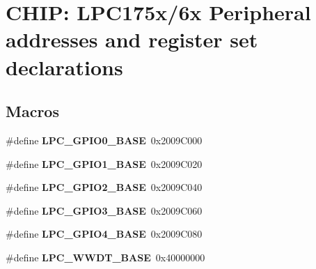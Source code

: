 \hypertarget{group___p_e_r_i_p_h__175_x__6_x___b_a_s_e}{\section{C\+H\+I\+P\+: L\+P\+C175x/6x Peripheral addresses and register set declarations}
\label{group___p_e_r_i_p_h__175_x__6_x___b_a_s_e}
}
\subsection*{Macros}
\begin{DoxyCompactItemize}
\item 
\hypertarget{group___p_e_r_i_p_h__175_x__6_x___b_a_s_e_ga09e0e964ea1abf3b991772df2aa52405}{\#define {\bfseries L\+P\+C\+\_\+\+G\+P\+I\+O0\+\_\+\+B\+A\+S\+E}~0x2009\+C000}\label{group___p_e_r_i_p_h__175_x__6_x___b_a_s_e_ga09e0e964ea1abf3b991772df2aa52405}

\item 
\hypertarget{group___p_e_r_i_p_h__175_x__6_x___b_a_s_e_ga9fb0536853721a3073bd69d94d0b7ec2}{\#define {\bfseries L\+P\+C\+\_\+\+G\+P\+I\+O1\+\_\+\+B\+A\+S\+E}~0x2009\+C020}\label{group___p_e_r_i_p_h__175_x__6_x___b_a_s_e_ga9fb0536853721a3073bd69d94d0b7ec2}

\item 
\hypertarget{group___p_e_r_i_p_h__175_x__6_x___b_a_s_e_gae5524b2d728167194033ec7a1841a36b}{\#define {\bfseries L\+P\+C\+\_\+\+G\+P\+I\+O2\+\_\+\+B\+A\+S\+E}~0x2009\+C040}\label{group___p_e_r_i_p_h__175_x__6_x___b_a_s_e_gae5524b2d728167194033ec7a1841a36b}

\item 
\hypertarget{group___p_e_r_i_p_h__175_x__6_x___b_a_s_e_ga56c68c5326b521b3278a35f4d81369a9}{\#define {\bfseries L\+P\+C\+\_\+\+G\+P\+I\+O3\+\_\+\+B\+A\+S\+E}~0x2009\+C060}\label{group___p_e_r_i_p_h__175_x__6_x___b_a_s_e_ga56c68c5326b521b3278a35f4d81369a9}

\item 
\hypertarget{group___p_e_r_i_p_h__175_x__6_x___b_a_s_e_gaa54352e7745932e78b56bcbc1d70fa21}{\#define {\bfseries L\+P\+C\+\_\+\+G\+P\+I\+O4\+\_\+\+B\+A\+S\+E}~0x2009\+C080}\label{group___p_e_r_i_p_h__175_x__6_x___b_a_s_e_gaa54352e7745932e78b56bcbc1d70fa21}

\item 
\hypertarget{group___p_e_r_i_p_h__175_x__6_x___b_a_s_e_ga9b83c39ba53f9c9e87974984c96e35de}{\#define {\bfseries L\+P\+C\+\_\+\+W\+W\+D\+T\+\_\+\+B\+A\+S\+E}~0x40000000}\label{group___p_e_r_i_p_h__175_x__6_x___b_a_s_e_ga9b83c39ba53f9c9e87974984c96e35de}


\end{DoxyCompactItemize}
